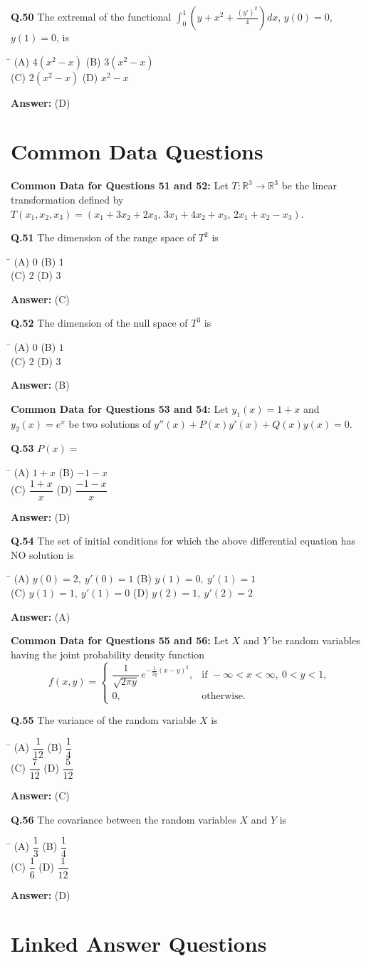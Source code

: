 \documentclass[11pt,a4paper]{article}
\newcommand{\optsfourA}[4]{%
  \begin{tabbing}
    \hspace{0.48\linewidth}\=\kill
    (A) #1 \> (B) #2 \\[2pt]
    (C) #3 \> (D) #4
  \end{tabbing}%
}
\newcommand{\ans}[1]{\textbf{Answer:} #1\par\medskip}
\begin{document}
\textbf{Q.50} The extremal of the functional $\displaystyle\int_0^1 \left(y + x^2 + \frac{(y')^2}{4}\right)dx$, $y(0) = 0$, $y(1) = 0$, is
\optsfourA{$4(x^2 - x)$}{$3(x^2 - x)$}{$2(x^2 - x)$}{$x^2 - x$}
\ans{(D)}

\section*{Common Data Questions}

\textbf{Common Data for Questions 51 and 52:}
Let $T : \mathbb{R}^3 \to \mathbb{R}^3$ be the linear transformation defined by $T(x_1, x_2, x_3) = (x_1 + 3x_2 + 2x_3,\, 3x_1 + 4x_2 + x_3,\, 2x_1 + x_2 - x_3)$.

\textbf{Q.51} The dimension of the range space of $T^2$ is
\optsfourA{$0$}{$1$}{$2$}{$3$}
\ans{(C)}

\textbf{Q.52} The dimension of the null space of $T^3$ is
\optsfourA{$0$}{$1$}{$2$}{$3$}
\ans{(B)}

\medskip
\textbf{Common Data for Questions 53 and 54:}
Let $y_1(x) = 1 + x$ and $y_2(x) = e^x$ be two solutions of $y''(x) + P(x)y'(x) + Q(x)y(x) = 0$.

\textbf{Q.53} $P(x) =$
\optsfourA{$1 + x$}{$-1 - x$}{$\dfrac{1 + x}{x}$}{$\dfrac{-1 - x}{x}$}
\ans{(D)}

\textbf{Q.54} The set of initial conditions for which the above differential equation has NO solution is
\optsfourA{$y(0) = 2,\ y'(0) = 1$}{$y(1) = 0,\ y'(1) = 1$}{$y(1) = 1,\ y'(1) = 0$}{$y(2) = 1,\ y'(2) = 2$}
\ans{(A)}

\medskip
\textbf{Common Data for Questions 55 and 56:}
Let $X$ and $Y$ be random variables having the joint probability density function
\[
  f(x, y) = \begin{cases} \dfrac{1}{\sqrt{2\pi y}}\, e^{-\frac{1}{2y}(x - y)^2}, & \text{if } -\infty < x < \infty,\ 0 < y < 1, \\ 0, & \text{otherwise.} \end{cases}
\]

\textbf{Q.55} The variance of the random variable $X$ is
\optsfourA{$\dfrac{1}{12}$}{$\dfrac{1}{4}$}{$\dfrac{7}{12}$}{$\dfrac{5}{12}$}
\ans{(C)}

\textbf{Q.56} The covariance between the random variables $X$ and $Y$ is
\optsfourA{$\dfrac{1}{3}$}{$\dfrac{1}{4}$}{$\dfrac{1}{6}$}{$\dfrac{1}{12}$}
\ans{(D)}

\section*{Linked Answer Questions}
\end{document}
